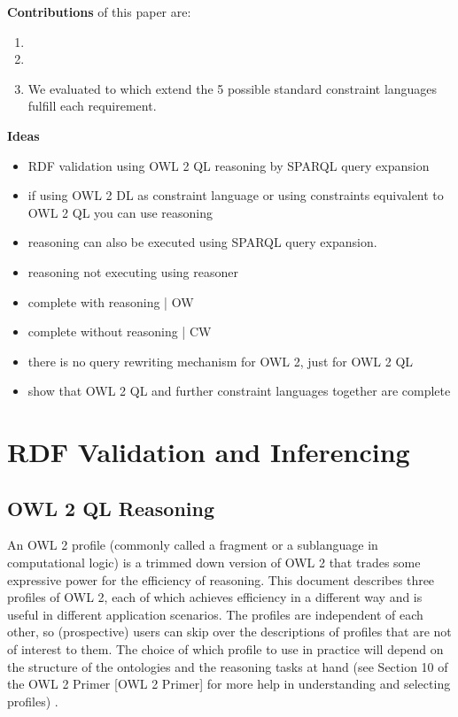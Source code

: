 \documentclass{llncs}
\begin{document}
\textbf{Contributions} of this paper are:
\begin{enumerate}
  \item
	\item
	\item We evaluated to which extend the 5 possible standard constraint languages fulfill each requirement.
\end{enumerate}

\textbf{Ideas}

\begin{itemize}
	\item RDF validation using OWL 2 QL reasoning by SPARQL query expansion
	\item if using OWL 2 DL as constraint language or using constraints equivalent to OWL 2 QL you can use reasoning 
	\item reasoning can also be executed using SPARQL query expansion.
	\item reasoning not executing using reasoner
\end{itemize}

\begin{itemize}
	\item complete with reasoning | OW
	\item complete without reasoning | CW
	\item there is no query rewriting mechanism for OWL 2, just for OWL 2 QL
	\item show that OWL 2 QL and further constraint languages together are complete
\end{itemize}

\section{RDF Validation and Inferencing}

\subsection{OWL 2 QL Reasoning}

An OWL 2 profile (commonly called a fragment or a sublanguage in computational logic) is a trimmed down version of OWL 2 that trades some expressive power for the efficiency of reasoning. This document describes three profiles of OWL 2, each of which achieves efficiency in a different way and is useful in different application scenarios. The profiles are independent of each other, so (prospective) users can skip over the descriptions of profiles that are not of interest to them. The choice of which profile to use in practice will depend on the structure of the ontologies and the reasoning tasks at hand (see Section 10 of the OWL 2 Primer [OWL 2 Primer] for more help in understanding and selecting profiles) \cite{owl2profiles2008}. 
\end{document}

